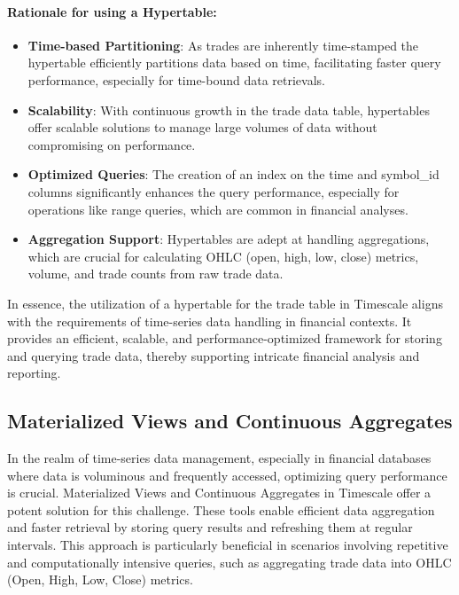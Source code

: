 \paragraph{Rationale for using a Hypertable:}
\begin{itemize}
\item \textbf{Time-based Partitioning}: As trades are inherently time-stamped the hypertable efficiently partitions data based on time, facilitating faster query performance, especially for time-bound data retrievals.
\item \textbf{Scalability}: With continuous growth in the trade data table, hypertables offer scalable solutions to manage large volumes of data without compromising on performance.
\item \textbf{Optimized Queries}: The creation of an index on the time and symbol\_id columns significantly enhances the query performance, especially for operations like range queries, which are common in financial analyses.
\item \textbf{Aggregation Support}: Hypertables are adept at handling aggregations, which are crucial for calculating OHLC (open, high, low, close) metrics, volume, and trade counts from raw trade data.
\end{itemize}

In essence, the utilization of a hypertable for the trade table in Timescale aligns with the requirements of time-series data handling in financial contexts. It provides an efficient, scalable, and performance-optimized framework for storing and querying trade data, thereby supporting intricate financial analysis and reporting.

\subsection{Materialized Views and Continuous Aggregates}

In the realm of time-series data management, especially in financial databases where data is voluminous and frequently accessed, optimizing query performance is crucial. Materialized Views and Continuous Aggregates in Timescale offer a potent solution for this challenge. These tools enable efficient data aggregation and faster retrieval by storing query results and refreshing them at regular intervals. This approach is particularly beneficial in scenarios involving repetitive and computationally intensive queries, such as aggregating trade data into OHLC (Open, High, Low, Close) metrics.

